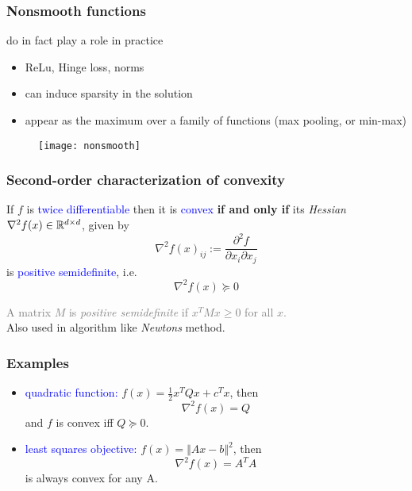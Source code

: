 \documentclass{beamer}
\begin{document}
\begin{frame}
  \frametitle{Nonsmooth functions }
  do in fact play a role in practice
  \begin{itemize}
    \item ReLu, Hinge loss, norms
    \item can induce sparsity in the solution
    \item appear as the maximum over a family of functions (max pooling, or min-max)
  \end{itemize}
  \begin{figure}[ht]
    \centering
    \texttt{[image: nonsmooth]}
  \end{figure}


\end{frame}

\begin{frame}
  \frametitle{Second-order characterization of convexity}
  If $f$ is \textcolor{blue}{twice differentiable} then it is \textcolor{blue}{convex} \textbf{if and only if} its \emph{Hessian} $\nabla^2 f(x) \in \mathbb{R}^{d \times d}$, given by
  \begin{equation}
    {\nabla^2 f(x)}_{ij} := \frac{\partial^2 f}{\partial x_i \partial x_j}
  \end{equation}
  is \textcolor{blue}{positive semidefinite}, i.e.
  \begin{equation}
    \nabla^2 f(x) \succcurlyeq 0
  \end{equation}

  \textcolor{gray}{A matrix $M$ is \emph{positive semidefinite} if $x^T M x \ge 0$ for all $x$.}\\
  Also used in algorithm like \emph{Newtons} method.

\end{frame}

\begin{frame}
  \frametitle{Examples}
  \begin{itemize}
    \item \textcolor{blue}{quadratic function:} $f(x)= \frac12 x^T Q x + c^T x$, then
          \begin{equation}
            \nabla^2 f(x) = Q
          \end{equation}
          and $f$ is convex iff $Q \succcurlyeq 0$.
    \item \textcolor{blue}{least squares objective:} $f(x) = \Vert Ax -b \Vert^2$, then
          \begin{equation}
             \nabla^2 f(x) = A^T A
          \end{equation}
          is always convex for any A.
  \end{itemize}
\end{frame}
\end{document}
